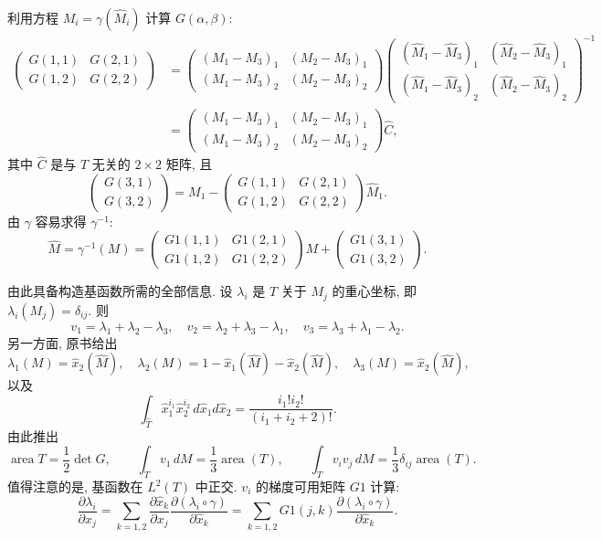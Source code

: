 \hypertarget{appendix-02-page-343}{}
利用方程 $M_i=\gamma(\widehat M_i)$ 计算 $G(\alpha,\beta)$:
\[
\begin{aligned}
\begin{pmatrix}G(1,1)&G(2,1)\\G(1,2)&G(2,2)\end{pmatrix}
&=
\begin{pmatrix}(M_1-M_3)_1&(M_2-M_3)_1\\(M_1-M_3)_2&(M_2-M_3)_2\end{pmatrix}
\begin{pmatrix}(\widehat M_1-\widehat M_3)_1&(\widehat M_2-\widehat M_3)_1\\(\widehat M_1-\widehat M_3)_2&(\widehat M_2-\widehat M_3)_2\end{pmatrix}^{-1}\\
&=
\begin{pmatrix}(M_1-M_3)_1&(M_2-M_3)_1\\(M_1-M_3)_2&(M_2-M_3)_2\end{pmatrix}\widehat C,
\end{aligned}
\]
其中 $\widehat C$ 是与 $T$ 无关的 $2\times2$ 矩阵, 且
\[
\begin{pmatrix}G(3,1)\\G(3,2)\end{pmatrix}
=M_1-
\begin{pmatrix}G(1,1)&G(2,1)\\G(1,2)&G(2,2)\end{pmatrix}\widehat M_1.
\]
由 $\gamma$ 容易求得 $\gamma^{-1}$:
\[
\widehat M=\gamma^{-1}(M)
=
\begin{pmatrix}G1(1,1)&G1(2,1)\\G1(1,2)&G1(2,2)\end{pmatrix}M
+\begin{pmatrix}G1(3,1)\\G1(3,2)\end{pmatrix}.
\]

由此具备构造基函数所需的全部信息. 设 $\lambda_i$ 是 $T$ 关于 $M_j$ 的重心坐标, 即 $\lambda_i(M_j)=\delta_{ij}$. 则
\[
v_1=\lambda_1+\lambda_2-\lambda_3,
\quad
v_2=\lambda_2+\lambda_3-\lambda_1,
\quad
v_3=\lambda_3+\lambda_1-\lambda_2.
\]
另一方面, 原书给出
\[
\lambda_1(M)=\widehat x_2(\widehat M),
\quad
\lambda_2(M)=1-\widehat x_1(\widehat M)-\widehat x_2(\widehat M),
\quad
\lambda_3(M)=\widehat x_2(\widehat M),
\]
以及
\[
\int_{\widehat T}\widehat x_1^{i_1}\widehat x_2^{i_2}\,d\widehat x_1d\widehat x_2
=\frac{i_1!i_2!}{(i_1+i_2+2)!}.
\]
由此推出
\[
\operatorname{area}T=\frac12\det G,
\qquad
\int_Tv_1\,dM=\frac13\operatorname{area}(T),
\qquad
\int_Tv_iv_j\,dM=\frac13\delta_{ij}\operatorname{area}(T).
\]
值得注意的是, 基函数在 $L^2(T)$ 中正交. $v_i$ 的梯度可用矩阵 $G1$ 计算:
\[
\frac{\partial\lambda_i}{\partial x_j}
=\sum_{k=1,2}\frac{\partial\widehat x_k}{\partial x_j}
\frac{\partial(\lambda_i\circ\gamma)}{\partial\widehat x_k}
=\sum_{k=1,2}G1(j,k)
\frac{\partial(\lambda_i\circ\gamma)}{\partial\widehat x_k}.
\]

